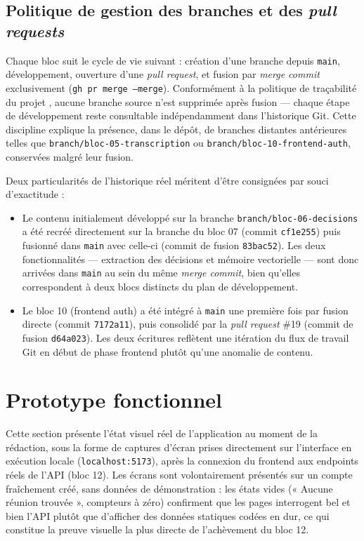 \documentclass[12pt, a4paper]{article}
\begin{document}
\subsection{Politique de gestion des branches et des \textit{pull requests}}

Chaque bloc suit le cycle de vie suivant : création d'une branche depuis \texttt{main}, développement, ouverture d'une \textit{pull request}, et fusion par \textit{merge commit} exclusivement (\texttt{gh pr merge --merge}). Conformément à la politique de traçabilité du projet \parencite{atlassian2024git}, aucune branche source n'est supprimée après fusion — chaque étape de développement reste consultable indépendamment dans l'historique Git. Cette discipline explique la présence, dans le dépôt, de branches distantes antérieures telles que \texttt{branch/bloc-05-transcription} ou \texttt{branch/bloc-10-frontend-auth}, conservées malgré leur fusion.

Deux particularités de l'historique réel méritent d'être consignées par souci d'exactitude :

\begin{itemize}
  \item Le contenu initialement développé sur la branche \texttt{branch/bloc-06-decisions} a été recréé directement sur la branche du bloc 07 (commit \texttt{cf1e255}) puis fusionné dans \texttt{main} avec celle-ci (commit de fusion \texttt{83bac52}). Les deux fonctionnalités — extraction des décisions et mémoire vectorielle — sont donc arrivées dans \texttt{main} au sein du même \textit{merge commit}, bien qu'elles correspondent à deux blocs distincts du plan de développement.
  \item Le bloc 10 (frontend auth) a été intégré à \texttt{main} une première fois par fusion directe (commit \texttt{7172a11}), puis consolidé par la \textit{pull request} \#19 (commit de fusion \texttt{d64a023}). Les deux écritures reflètent une itération du flux de travail Git en début de phase frontend plutôt qu'une anomalie de contenu.
\end{itemize}

\section{Prototype fonctionnel}
\label{sec:prototype-note}

Cette section présente l'état visuel réel de l'application au moment de la rédaction, sous la forme de captures d'écran prises directement sur l'interface en exécution locale (\texttt{localhost:5173}), après la connexion du frontend aux endpoints réels de l'API (bloc 12). Les écrans sont volontairement présentés sur un compte fraîchement créé, sans données de démonstration : les états vides (« Aucune réunion trouvée », compteurs à zéro) confirment que les pages interrogent bel et bien l'API plutôt que d'afficher des données statiques codées en dur, ce qui constitue la preuve visuelle la plus directe de l'achèvement du bloc 12.
\end{document}
